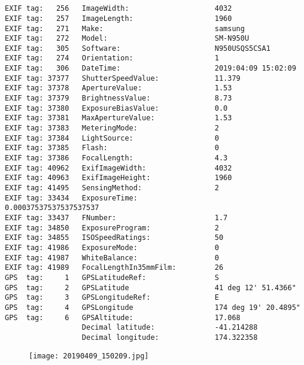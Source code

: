 \section{\protect{}}
\noindent 
\noindent
\begin{lstlisting}
EXIF tag:   256   ImageWidth:                    4032
EXIF tag:   257   ImageLength:                   1960
EXIF tag:   271   Make:                          samsung
EXIF tag:   272   Model:                         SM-N950U
EXIF tag:   305   Software:                      N950USQS5CSA1
EXIF tag:   274   Orientation:                   1
EXIF tag:   306   DateTime:                      2019:04:09 15:02:09
EXIF tag: 37377   ShutterSpeedValue:             11.379
EXIF tag: 37378   ApertureValue:                 1.53
EXIF tag: 37379   BrightnessValue:               8.73
EXIF tag: 37380   ExposureBiasValue:             0.0
EXIF tag: 37381   MaxApertureValue:              1.53
EXIF tag: 37383   MeteringMode:                  2
EXIF tag: 37384   LightSource:                   0
EXIF tag: 37385   Flash:                         0
EXIF tag: 37386   FocalLength:                   4.3
EXIF tag: 40962   ExifImageWidth:                4032
EXIF tag: 40963   ExifImageHeight:               1960
EXIF tag: 41495   SensingMethod:                 2
EXIF tag: 33434   ExposureTime:                  0.00037537537537537537
EXIF tag: 33437   FNumber:                       1.7
EXIF tag: 34850   ExposureProgram:               2
EXIF tag: 34855   ISOSpeedRatings:               50
EXIF tag: 41986   ExposureMode:                  0
EXIF tag: 41987   WhiteBalance:                  0
EXIF tag: 41989   FocalLengthIn35mmFilm:         26
GPS  tag:     1   GPSLatitudeRef:                S
GPS  tag:     2   GPSLatitude                    41 deg 12' 51.4366"
GPS  tag:     3   GPSLongitudeRef:               E
GPS  tag:     4   GPSLongitude                   174 deg 19' 20.4895"
GPS  tag:     6   GPSAltitude:                   17.068
                  Decimal latitude:              -41.214288
                  Decimal longitude:             174.322358

\end{lstlisting}
\clearpage
\begin{figure}
\raggedleft
\texttt{[image: 20190409\_150209.jpg]}
\end{figure}


\clearpage
